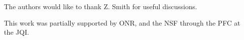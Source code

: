 \documentclass[aip,rsi,reprint]{revtex4-1} %
\begin{document}
The authors would like to thank Z. Smith for useful discussions.

This work was partially supported by ONR, and the NSF through the PFC at the JQI.

%



%
%
\end{document}
